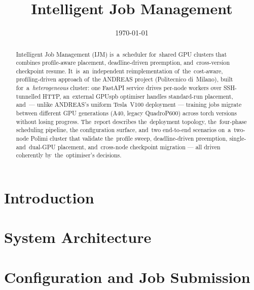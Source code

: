 

\title{Intelligent Job Management}
\date{\today}


\makeOwnTitle

\begin{abstract}
Intelligent Job Management (IJM) is~a~scheduler for~shared GPU clusters
that combines profile-aware placement, deadline-driven preemption,
and~cross-version checkpoint resume.  It~is~an~independent
reimplementation of~the~cost-aware, profiling-driven approach of~the
ANDREAS project (Politecnico di~Milano), built for~a~\emph{heterogeneous}
cluster: one FastAPI service drives per-node workers over SSH-tunnelled
HTTP, an~external GPUspb optimiser handles standard-run placement,
and~--- unlike ANDREAS's uniform Tesla~V100 deployment --- training jobs
migrate between different GPU generations (A40, legacy QuadroP600)
across torch versions without losing progress.  The~report describes
the~deployment topology, the~four-phase scheduling pipeline, the
configuration surface, and~two end-to-end scenarios on~a~two-node Polimi
cluster that validate the~profile sweep, deadline-driven preemption,
single- and~dual-GPU placement, and~cross-node checkpoint migration ---
all driven coherently by~the~optimiser's decisions.
\end{abstract}

\tableofcontents

\chapter{Introduction}\label{ch:introduction}


\chapter{System Architecture}\label{ch:architecture}


\chapter{Configuration and Job Submission}\label{ch:config}


